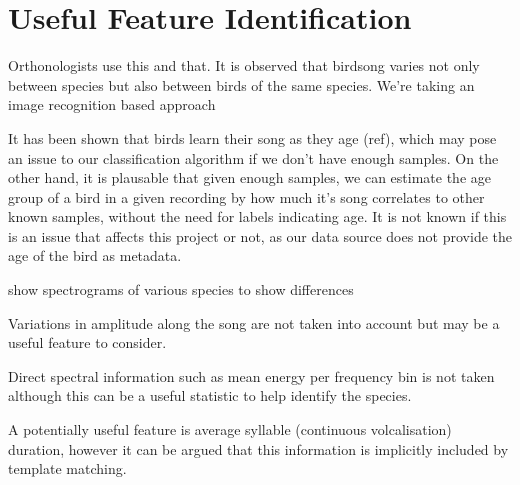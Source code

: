 \section{Useful Feature Identification}

Orthonologists use this and that.
It is observed that birdsong varies not only between species but also between
birds of the same species.
We're taking an image recognition based approach

It has been shown that birds learn their song as they age (ref), which may pose
an issue to our classification algorithm if we don't have enough samples.
On the other hand, it is plausable that given enough samples, we can estimate
the age group of a bird in a given recording by how much it's song correlates
to other known samples, without the need for labels indicating age.
It is not known if this is an issue that affects this project or not, as our
data source does not provide the age of the bird as metadata.

show spectrograms of various species to show differences

Variations in amplitude along the song are not taken into account but may be a 
useful feature to consider.

Direct spectral information such as mean energy per frequency bin is not taken
although this can be a useful statistic to help identify the species.

A potentially useful feature is average syllable (continuous volcalisation)
duration, however it can be argued that this information is implicitly included
by template matching.
